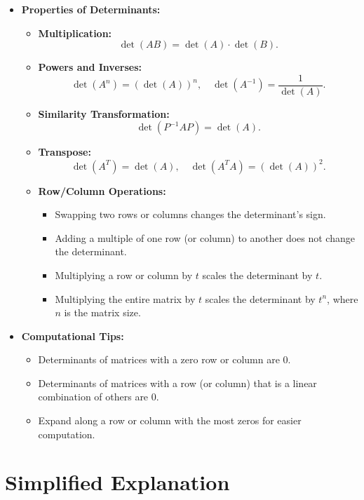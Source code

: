 \documentclass{article}
\begin{document}
\begin{itemize}
  \item \textbf{Properties of Determinants:}
    \begin{itemize}
      \item \textbf{Multiplication:}
        \[
          \det(AB) = \det(A) \cdot \det(B).
        \]
      \item \textbf{Powers and Inverses:}
        \[
          \det(A^n) = (\det(A))^n, \quad \det(A^{-1}) = \frac{1}{\det(A)}.
        \]
      \item \textbf{Similarity Transformation:}
        \[
          \det(P^{-1}AP) = \det(A).
        \]
      \item \textbf{Transpose:}
        \[
          \det(A^T) = \det(A), \quad \det(A^T A) = (\det(A))^2.
        \]
      \item \textbf{Row/Column Operations:}
        \begin{itemize}
          \item Swapping two rows or columns changes the determinant's sign.
          \item Adding a multiple of one row (or column) to another does not change the determinant.
          \item Multiplying a row or column by $t$ scales the determinant by $t$.
          \item Multiplying the entire matrix by $t$ scales the determinant by $t^n$, where $n$ is the matrix size.
        \end{itemize}
    \end{itemize}

  \item \textbf{Computational Tips:}
    \begin{itemize}
      \item Determinants of matrices with a zero row or column are $0$.
      \item Determinants of matrices with a row (or column) that is a linear combination of others are $0$.
      \item Expand along a row or column with the most zeros for easier computation.
    \end{itemize}
\end{itemize}

\section*{Simplified Explanation}
\end{document}
